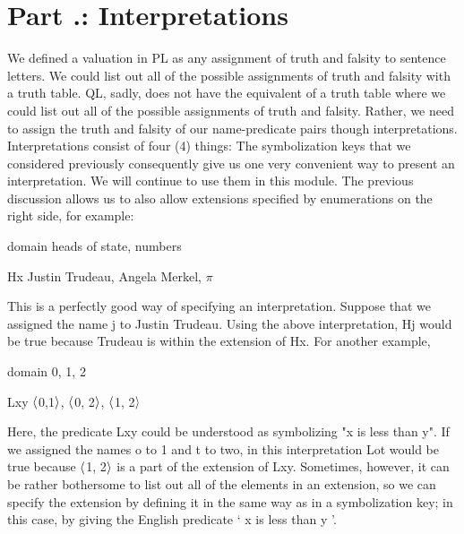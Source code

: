 \section{Part \thechapcount.\theseccount: Interpretations}
We defined a valuation in PL as any assignment of truth and falsity to sentence letters. We could list out all of the possible assignments of truth and falsity with a truth table. QL, sadly, does not have the equivalent of a truth table where we could list out all of the possible assignments of truth and falsity. Rather, we need to assign the truth and falsity of our name-predicate pairs though interpretations. Interpretations consist of four (4) things:
The symbolization keys that we considered previously consequently give us one very convenient way to present an interpretation. We will continue to use them in this module. The previous discussion allows us to also allow extensions specified by enumerations on the right side, for example:
\begin{ekey}
\item[domain] heads of state, numbers
\item[Hx] Justin Trudeau, Angela Merkel, $\pi$
\end{ekey}
This is a perfectly good way of specifying an interpretation. Suppose that we assigned the name j to Justin Trudeau. Using the above interpretation, Hj would be true because Trudeau is within the extension of Hx. For another example,
\begin{ekey}
\item[domain] 0, 1, 2
\item[Lxy] $\langle$0,1$\rangle$, $\langle$0, 2$\rangle$, $\langle$1, 2$\rangle$
\end{ekey}
Here, the predicate Lxy could be understood as symbolizing "x is less than y". If we assigned the names o to 1 and t to two, in this interpretation Lot would be true because $\langle$1, 2$\rangle$ is a part of the extension of Lxy. Sometimes, however, it can be rather bothersome to list out all of the elements in an extension, so we can specify the extension by defining it in the same way as in a symbolization key; in this case, by giving the English predicate ‘ x is less than y ’.

